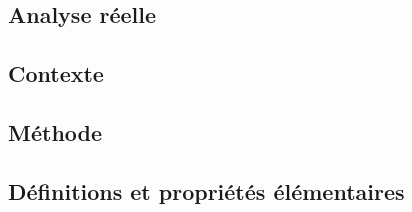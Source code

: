\documentclass[11pt,a4paper]{article}
\begin{document}
\begin{center}  
\section*{Analyse réelle} 
\end{center}



\subsection*{Contexte}

\subsection*{Méthode}

\subsection*{Définitions et propriétés élémentaires}
\end{document}
